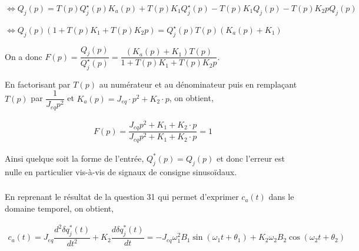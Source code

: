 \documentclass[10pt,fleqn]{article} %
\begin{document}
$\Leftrightarrow Q_j(p) = 
    T(p)Q_j^{\star}(p) K_a(p) + 
        T(p)K_1 Q_j^{\star}(p) -T(p)K_1  Q_j(p)   - T(p)K_2 p Q_j(p) 
     $

$\Leftrightarrow Q_j(p)\left(1     +T(p)K_1     + T(p)K_2 p\right)= 
      Q_j^{\star}(p)T(p) \left(  K_a(p)     +K_1 \right)     $

On a donc $F(p)=\dfrac{Q_j(p)}{Q_j^{\star}(p)}=\dfrac{\left(K_a(p) +K_1\right)T(p)}{1+T(p)K_1 + T(p)K_2 p}$.

En factorisant par $T(p)$ au numérateur et au dénominateur puis en remplaçant $T(p)$ par $\dfrac{1}{J_{eq}p^2}$ et $K_a(p)=J_{eq}\cdot p^2+K_2\cdot p$, on obtient,

\begin{align*}
F(p)=\dfrac{J_{eq}p^2+K_1+K_2\cdot p}{J_{eq}p^2+K_1+K_2\cdot p}=1
\end{align*}

Ainsi quelque soit la forme de l'entrée, $Q^*_j(p)=Q_j(p)$ et donc l'erreur est nulle en particulier vis-à-vis de signaux de consigne sinusoïdaux.

\subparagraph{}\textit{}%

En reprenant le résultat de la question 31 qui permet d'exprimer $c_a(t)$ dans le domaine temporel, on obtient,

\begin{align*}
c_a(t)=J_{eq}\dfrac{d^2\delta q^*_j(t)}{dt^2}+K_{2}\dfrac{d\delta q^*_j(t)}{dt}
=-J_{eq}\omega_1^2B_1\sin\left(\omega_1t+\theta_1\right)+K_2\omega_2B_2\cos\left(\omega_2t+\theta_2\right)
\end{align*}

\subparagraph{}\textit{}%
\end{document}
